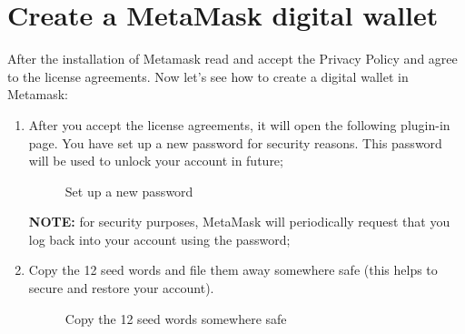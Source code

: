 \documentclass[ManualeUtente]{subfiles}
\begin{document}
\section{Create a MetaMask digital wallet}
After the installation of Metamask read and accept the Privacy Policy and agree to the license agreements. Now let's see how to create a digital wallet in Metamask:
\begin{enumerate}	
	\item After you accept the license agreements, it will open the following plugin-in page. You have set up a new password for security reasons. This password will be used to unlock your account in future;
	\begin{figure}[H]
		\centering
		\caption{Set up a new password}
		\label{fig:Set up a new password}
	\end{figure}
	\textbf{NOTE:} for security purposes, MetaMask will periodically request that you log back into your account using the password;
	\item Copy the 12 seed words and file them away somewhere safe (this helps to secure and restore your account).
	\begin{figure}[H]
		\centering
		\caption{Copy the 12 seed words somewhere safe}
		\label{fig:Copy the 12 seed words somewhere safe}
	\end{figure}
\end{enumerate}
\newpage
\end{document}
